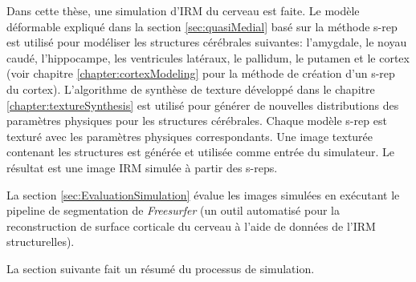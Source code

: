


Dans cette thèse, une simulation d'IRM du cerveau est faite.
Le modèle déformable expliqué dans la section \ref{sec:quasiMedial} basé sur la méthode s-rep est utilisé 
pour modéliser les structures cérébrales suivantes: 
l'amygdale, le noyau caudé, l'hippocampe, les ventricules latéraux, le pallidum, le putamen et 
le cortex (voir chapitre \ref{chapter:cortexModeling} pour la méthode de création d'un s-rep du cortex).
L'algorithme de synthèse de texture développé dans le chapitre \ref{chapter:textureSynthesis} 
est utilisé pour générer de nouvelles distributions des paramètres physiques pour les structures cérébrales.
Chaque modèle s-rep est texturé avec les paramètres physiques correspondants.
Une image texturée contenant les structures est générée et utilisée comme entrée du simulateur. 
Le résultat est une image IRM simulée à partir des s-reps.

La section \ref{sec:EvaluationSimulation} évalue les images simulées 
en exécutant le pipeline de segmentation de \textit{Freesurfer} 
(un outil automatisé pour la reconstruction de surface corticale du cerveau à l'aide de données de l'IRM structurelles).

La section suivante fait un résumé du processus de simulation.

